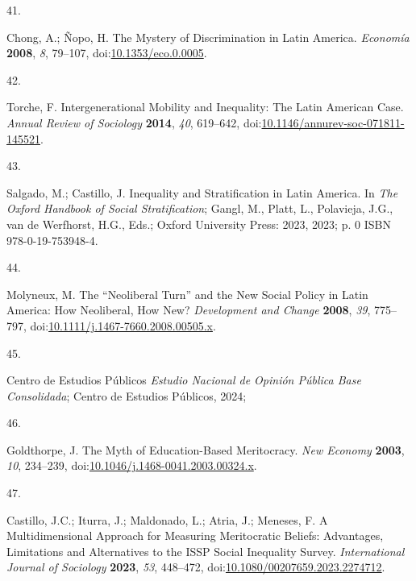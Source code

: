 \documentclass[
  12pt,
  letterpaper,
]{article}
\newlength{\cslhangindent}
\newlength{\csllabelwidth}
\newenvironment{CSLReferences}[2] %
 {\begin{list}{}{%
  \setlength{\itemindent}{0pt}
  \setlength{\leftmargin}{0pt}
  \setlength{\parsep}{0pt}
  \ifodd #1
   \setlength{\leftmargin}{\cslhangindent}
   \setlength{\itemindent}{-1\cslhangindent}
  \fi
  \setlength{\itemsep}{#2\baselineskip}}}
 {\end{list}}
\newcommand{\CSLLeftMargin}[1]{\parbox[t]{\csllabelwidth}{\strut#1\strut}}
\newcommand{\CSLRightInline}[1]{\parbox[t]{\linewidth - \csllabelwidth}{\strut#1\strut}}
\begin{document}
\begin{CSLReferences}{0}{0}
\CSLLeftMargin{41. }%
\CSLRightInline{Chong, A.; Ñopo, H. The {Mystery} of {Discrimination} in
{Latin America}. \emph{Econom{í}a} \textbf{2008}, \emph{8}, 79--107,
doi:\href{https://doi.org/10.1353/eco.0.0005}{10.1353/eco.0.0005}.}

\CSLLeftMargin{42. }%
\CSLRightInline{Torche, F. Intergenerational {Mobility} and
{Inequality}: {The Latin American Case}. \emph{Annual Review of
Sociology} \textbf{2014}, \emph{40}, 619--642,
doi:\href{https://doi.org/10.1146/annurev-soc-071811-145521}{10.1146/annurev-soc-071811-145521}.}

\CSLLeftMargin{43. }%
\CSLRightInline{Salgado, M.; Castillo, J. Inequality and
{Stratification} in {Latin America}. In \emph{The {Oxford Handbook} of
{Social Stratification}}; Gangl, M., Platt, L., Polavieja, J.G., van de
Werfhorst, H.G., Eds.; Oxford University Press: 2023, 2023; p. 0 ISBN
978-0-19-753948-4.}

\CSLLeftMargin{44. }%
\CSLRightInline{Molyneux, M. The {``{Neoliberal Turn}''} and the {New
Social Policy} in {Latin America}: {How Neoliberal}, {How New}?
\emph{Development and Change} \textbf{2008}, \emph{39}, 775--797,
doi:\href{https://doi.org/10.1111/j.1467-7660.2008.00505.x}{10.1111/j.1467-7660.2008.00505.x}.}

\CSLLeftMargin{45. }%
\CSLRightInline{Centro de Estudios Públicos \emph{Estudio {Nacional} de
{Opini{ó}n P{ú}blica Base Consolidada}}; Centro de Estudios P{ú}blicos,
2024;}

\CSLLeftMargin{46. }%
\CSLRightInline{Goldthorpe, J. The Myth of Education-Based Meritocracy.
\emph{New Economy} \textbf{2003}, \emph{10}, 234--239,
doi:\href{https://doi.org/10.1046/j.1468-0041.2003.00324.x}{10.1046/j.1468-0041.2003.00324.x}.}

\CSLLeftMargin{47. }%
\CSLRightInline{Castillo, J.C.; Iturra, J.; Maldonado, L.; Atria, J.;
Meneses, F. A {Multidimensional Approach} for {Measuring Meritocratic
Beliefs}: {Advantages}, {Limitations} and {Alternatives} to the {ISSP
Social Inequality Survey}. \emph{International Journal of Sociology}
\textbf{2023}, \emph{53}, 448--472,
doi:\href{https://doi.org/10.1080/00207659.2023.2274712}{10.1080/00207659.2023.2274712}.}


\end{CSLReferences}
\end{document}
